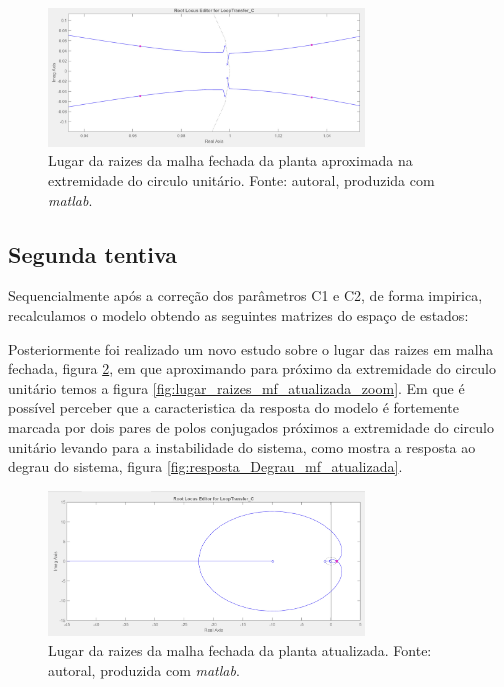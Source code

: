 \documentclass{ifacconf}
\begin{document}
\begin{figure}[!htb]
  \begin{center}
  \includegraphics[width=8.4cm]{figures/lugar_raizes_mf_aproximada.png}    %
  \caption{Lugar da raizes da malha fechada da planta aproximada na extremidade do circulo unitário. Fonte: autoral, produzida com \textit{matlab}.} 
  \label{fig:lugar_raizes_mf_aproximada}
  \end{center}
\end{figure}

\subsection{Segunda tentiva} %
Sequencialmente após a correção dos parâmetros C1 e C2, de forma impirica, recalculamos o modelo obtendo as seguintes
matrizes do espaço de estados:

Posteriormente foi realizado um novo estudo sobre o lugar das raizes em malha fechada, figura \ref{fig:lugar_raizes_mf_atualizada}, em que
aproximando para próximo da extremidade do circulo unitário temos a figura \ref{fig:lugar_raizes_mf_atualizada_zoom}. 
Em que é possível perceber que a caracteristica da resposta do modelo é fortemente marcada por dois pares de polos conjugados
próximos a extremidade do circulo unitário levando para a instabilidade do sistema, como mostra a resposta ao degrau do sistema, figura \ref{fig:resposta_Degrau_mf_atualizada}.

\begin{figure}[!htb]
  \begin{center}
  \includegraphics[width=8.4cm]{figures/lugar_raizes_mf_corrigida.png}    %
  \caption{Lugar da raizes da malha fechada da planta atualizada. Fonte: autoral, produzida com \textit{matlab}.} 
  \label{fig:lugar_raizes_mf_atualizada}
  \end{center}
\end{figure}
\end{document}
